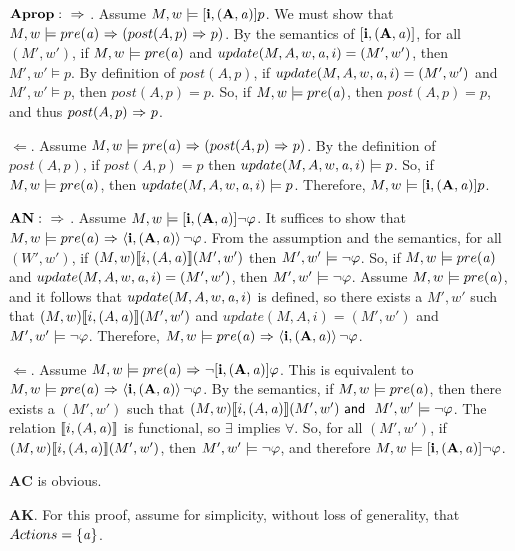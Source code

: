 $\mathbf{Aprop: {\ \Rightarrow \ }}$. Assume $M,w \models \mathbf{[{i,(A,\mathit{a})}]}p$. We must show that $M,w \models pre(\mathit{a}){\ \Rightarrow \ } (post(A,p) {\ \Rightarrow \ } p)$. By the semantics of $\mathbf{[{i,(A,\mathit{a})}]}$, for all $(M',w')$, if $M,w \models pre(\mathit{a})$ and $update(M,A,w,\mathit{a},i)= (M',w')$, then $M',w' \models p$. By definition of $post(A,p)$, if $update(M,A,w,\mathit{a},i)=(M',w')$ and $M',w' \models p$, then $post(A,p)=p$. So, if $M,w \models pre(\mathit{a})$, then $post(A,p) = p$, and thus $post(A,p){\ \Rightarrow \ } p$. 

$\Leftarrow$. Assume $M,w \models pre(\mathit{a}) {\ \Rightarrow \ } (post(A,p){\ \Rightarrow \ } p)$. By the definition of $post(A,p)$, if $post(A,p)=p$ then $update(M,A,w,\mathit{a},i)\models p$. So, if $M,w \models pre(\mathit{a})$, then $update(M,A,w,\mathit{a},i)\models p$. Therefore, $M,w\models \mathbf{[{i,(A,\mathit{a})}]}p$.

$\mathbf{AN: {\ \Rightarrow \ }}$. Assume $M,w \models \mathbf{[{i,(A,\mathit{a})}]}{\neg} \varphi$. It suffices to show that $M,w \models pre(\mathit{a}) {\ \Rightarrow \ } \mathbf{\langle i, (A,\mathit{a}) \rangle}\,{\neg} \varphi$. From the assumption and the semantics, for all $(W',w')$, if $(M,w)\llbracket i, (A,\mathit{a}) \rrbracket (M',w')$ then $M',w' \models {\neg} \varphi$. So, if $M,w \models pre(\mathit{a})$ and $update(\\M,A,w,\mathit{a},i)=(M',w')$, then $M',w' \models {\neg} \varphi$. Assume $M,w \models pre(\mathit{a})$, and it follows that $update(M,A,w,\mathit{a},i)$ is defined, so there exists a $M',w'$ such that $(M,w)\llbracket i, (A,\mathit{a}) \rrbracket(M',w')$ and $update(M,A,i)=(M',w')$ and $M',w' \models {\neg} \varphi$. Therefore, $M,w \models pre(\mathit{a}) {\ \Rightarrow \ } \mathbf{\langle i, (A,\mathit{a}) \rangle}\,{\neg} \varphi$.

$\Leftarrow$. Assume $M,w \models pre(\mathit{a}) {\ \Rightarrow \ } {\neg} \mathbf{[{i,(A,\mathit{a})}]}\varphi$. This is equivalent to $M,w \models pre(\mathit{a}) {\ \Rightarrow \ } \mathbf{\langle i, (A,\mathit{a}) \rangle}\,{\neg} \varphi$.  By the semantics, if $M,w \models pre(\mathit{a})$, then there exists a $(M',w')$ such that $(M,w)\llbracket i, (A,\mathit{a})\rrbracket (M',w') \textsf{\ and \ } M',w' \models {\neg} \varphi$. The relation $\llbracket i, (A,\mathit{a})\rrbracket$ is functional, so $\exists$ implies $\forall$. So, for all $(M',w')$, if $(M,w)\llbracket i,(A,\mathit{a})\rrbracket (M',\\w')$, then $M',w' \models {\neg} \varphi$, and therefore $M,w\models \mathbf{[{i,(A,\mathit{a})}]}{\neg} \varphi$.

$\mathbf{AC}$ is obvious.

$\mathbf{AK}$. For this proof, assume for simplicity, without loss of generality, that $Actions = \{\mathit{a}\}$.

